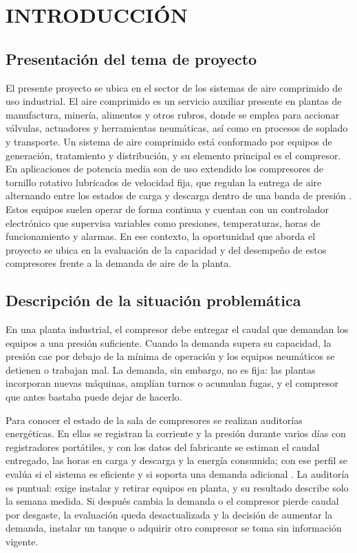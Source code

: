 
\chapter{INTRODUCCIÓN}

\section{Presentación del tema de proyecto}

El presente proyecto se ubica en el sector de los sistemas de aire comprimido de uso industrial. El aire comprimido es un servicio auxiliar presente en plantas de manufactura, minería, alimentos y otros rubros, donde se emplea para accionar válvulas, actuadores y herramientas neumáticas, así como en procesos de soplado y transporte. Un sistema de aire comprimido está conformado por equipos de generación, tratamiento y distribución, y su elemento principal es el compresor. En aplicaciones de potencia media son de uso extendido los compresores de tornillo rotativo lubricados de velocidad fija, que regulan la entrega de aire alternando entre los estados de carga y descarga dentro de una banda de presión \cite{liang2019}. Estos equipos suelen operar de forma continua y cuentan con un controlador electrónico que supervisa variables como presiones, temperaturas, horas de funcionamiento y alarmas. En ese contexto, la oportunidad que aborda el proyecto se ubica en la evaluación de la capacidad y del desempeño de estos compresores frente a la demanda de aire de la planta.

\section{Descripción de la situación problemática}

En una planta industrial, el compresor debe entregar el caudal que demandan los equipos a una presión suficiente. Cuando la demanda supera su capacidad, la presión cae por debajo de la mínima de operación y los equipos neumáticos se detienen o trabajan mal. La demanda, sin embargo, no es fija: las plantas incorporan nuevas máquinas, amplían turnos o acumulan fugas, y el compresor que antes bastaba puede dejar de hacerlo.

Para conocer el estado de la sala de compresores se realizan auditorías energéticas. En ellas se registran la corriente y la presión durante varios días con registradores portátiles, y con los datos del fabricante se estiman el caudal entregado, las horas en carga y descarga y la energía consumida; con ese perfil se evalúa si el sistema es eficiente y si soporta una demanda adicional \cite{cac2026}. La auditoría es puntual: exige instalar y retirar equipos en planta, y su resultado describe solo la semana medida. Si después cambia la demanda o el compresor pierde caudal por desgaste, la evaluación queda desactualizada y la decisión de aumentar la demanda, instalar un tanque o adquirir otro compresor se toma sin información vigente.

